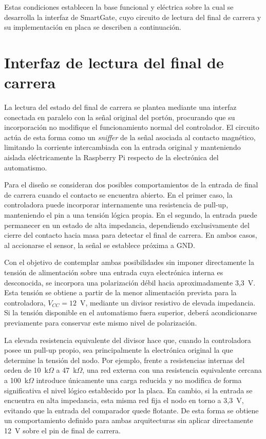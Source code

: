 Estas condiciones establecen la base funcional y eléctrica sobre la cual se desarrolla la interfaz de SmartGate, cuyo circuito de lectura del final de carrera y su implementación en placa se describen a continuación.

\section{Interfaz de lectura del final de carrera}

La lectura del estado del final de carrera se plantea mediante una interfaz conectada en paralelo con la señal original del portón, procurando que su incorporación no modifique el funcionamiento normal del controlador. El circuito actúa de esta forma como un \textit{sniffer} de la señal asociada al contacto magnético, limitando la corriente intercambiada con la entrada original y manteniendo aislada eléctricamente la Raspberry Pi respecto de la electrónica del automatismo.

Para el diseño se consideran dos posibles comportamientos de la entrada de final de carrera cuando el contacto se encuentra abierto. En el primer caso, la controladora puede incorporar internamente una resistencia de pull-up, manteniendo el pin a una tensión lógica propia. En el segundo, la entrada puede permanecer en un estado de alta impedancia, dependiendo exclusivamente del cierre del contacto hacia masa para detectar el final de carrera. En ambos casos, al accionarse el sensor, la señal se establece próxima a GND.

Con el objetivo de contemplar ambas posibilidades sin imponer directamente la tensión de alimentación sobre una entrada cuya electrónica interna es desconocida, se incorpora una polarización débil hacia aproximadamente 3,3~V. Esta tensión se obtiene a partir de la menor alimentación prevista para la controladora, $V_{CC} = 12$~V, mediante un divisor resistivo de elevada impedancia. Si la tensión disponible en el automatismo fuera superior, deberá acondicionarse previamente para conservar este mismo nivel de polarización.

La elevada resistencia equivalente del divisor hace que, cuando la controladora posee un pull-up propio, sea principalmente la electrónica original la que determine la tensión del nodo. Por ejemplo, frente a resistencias internas del orden de 10~k$\Omega$ a 47~k$\Omega$, una red externa con una resistencia equivalente cercana a 100~k$\Omega$ introduce únicamente una carga reducida y no modifica de forma significativa el nivel lógico establecido por la placa. En cambio, si la entrada se encuentra en alta impedancia, esta misma red fija el nodo en torno a 3,3~V, evitando que la entrada del comparador quede flotante. De esta forma se obtiene un comportamiento definido para ambas arquitecturas sin aplicar directamente 12~V sobre el pin de final de carrera.

